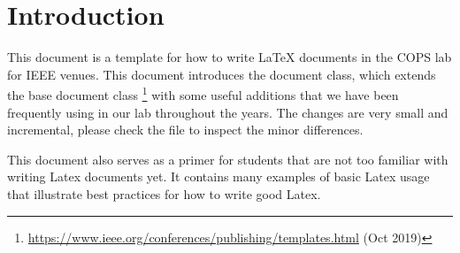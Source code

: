 \section{Introduction}
\label{sec:intro}

This document is a template for how to write LaTeX documents in the COPS lab for IEEE venues.
This document introduces the  document class, which extends the base  document class%
\footnote{\url{https://www.ieee.org/conferences/publishing/templates.html} (Oct 2019)}
with some useful additions that we have been frequently using in our lab throughout the years.
The changes are very small and incremental, please check the  file to inspect the minor differences.

This document also serves as a primer for students that are not too familiar with writing Latex documents yet.
It contains many examples of basic Latex usage that illustrate best practices for how to write good Latex.
